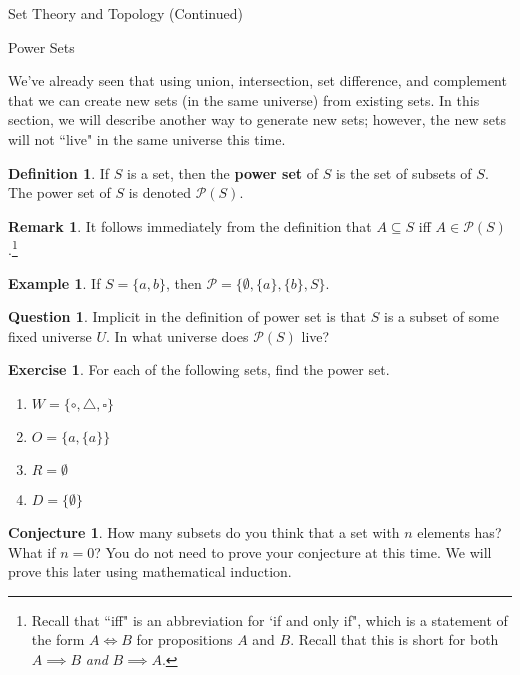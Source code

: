 \documentclass[11pt]{article}
\theoremstyle{definition}
\newtheorem{conjecture}[theorem]{Conjecture}
\newtheorem{definition}[theorem]{Definition}
\newtheorem{example}[theorem]{Example}
\newtheorem{exercise}[theorem]{Exercise}
\newtheorem{remark}[theorem]{Remark}
\newtheorem{question}[theorem]{Question}
\begin{document}
\addtocounter{section}{1}

\begin{section}{Set Theory and Topology (Continued)}

\addtocounter{subsection}{1}
\addtocounter{theorem}{27}

\begin{subsection}{Power Sets}

We've already seen that using union, intersection, set difference, and complement that we can create new sets (in the same universe) from existing sets.  In this section, we will describe another way to generate new sets; however, the new sets will not ``live" in the same universe this time.

\begin{definition}
If $S$ is a set, then the \textbf{power set} of $S$ is the set of subsets of $S$.  The power set of $S$ is denoted $\mathcal{P}(S)$.
\end{definition}

\begin{remark}
It follows immediately from the definition that $A\subseteq S$ iff $A\in\mathcal{P}(S)$.\footnote{Recall that ``iff" is an abbreviation for `if and only if", which is a statement of the form $A\iff B$ for propositions $A$ and $B$.  Recall that this is short for both $A\implies B$ \emph{and} $B\implies A$.}
\end{remark}

\begin{example}
If $S=\{a,b\}$, then $\mathcal{P}=\{\emptyset, \{a\}, \{b\}, S\}$.
\end{example}

\begin{question}
Implicit in the definition of power set is that $S$ is a subset of some fixed universe $U$.  In what universe does $\mathcal{P}(S)$ live?
\end{question}

\begin{exercise}
For each of the following sets, find the power set.
\begin{enumerate}
\item $W=\{\circ, \triangle, \square\}$
\item $O=\{a,\{a\}\}$
\item $R=\emptyset$
\item $D=\{\emptyset\}$
\end{enumerate}
\end{exercise}

\begin{conjecture}
How many subsets do you think that a set with $n$ elements has?  What if $n=0$?  You do not need to prove your conjecture at this time.  We will prove this later using mathematical induction.
\end{conjecture}


\end{subsection}
\end{section}
\end{document}
